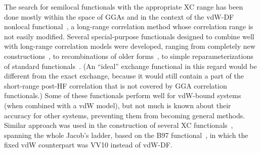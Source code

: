 The search for semilocal functionals with the appropriate XC range has been done mostly within the space of GGAs and in the context of the vdW-DF nonlocal functional~\cite{DionPRL04,LeePRB10,MurrayJCTC09}, a long-range correlation method whose correlation range is not easily modified.
Several special-purpose functionals designed to combine well with long-range correlation models were developed, ranging from completely new constructions~\cite{PernalPRL09,WellendorffPRB12}, to recombinations of older forms~\cite{CooperPRB10,HamadaPRB14,BerlandPRB14}, to simple reparameterizations of standard functionals~\cite{ZhangPRL98,KlimesJPCM10,KlimesPRB11}.
(An ``ideal'' exchange functional in this regard would be different from the exact exchange, because it would still contain a part of the short-range post-HF correlation that is not covered by GGA correlation functionals.)
Some of these functionals perform well for vdW-bound systems (when combined with a vdW model), but not much is known about their accuracy for other systems, preventing them from becoming general methods.
Similar approach was used in the construction of several XC functionals~\cite{MardirossianPCCP14,MardirossianJCP15a,MardirossianJCP16}, spanning the whole Jacob's ladder, based on the B97 functional~\cite{BeckeJCP97}, in which the fixed vdW counterpart was VV10 instead of vdW-DF\@.

